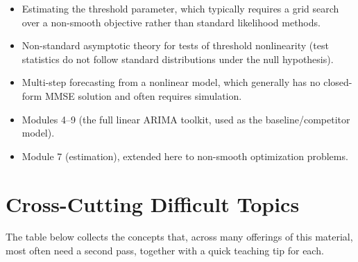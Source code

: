 \documentclass[11pt]{article}
\begin{document}
\begin{difficult}
\begin{itemize}
  \item Estimating the threshold parameter, which typically requires a grid search over a non-smooth objective rather than standard likelihood methods.
  \item Non-standard asymptotic theory for tests of threshold nonlinearity (test statistics do not follow standard distributions under the null hypothesis).
  \item Multi-step forecasting from a nonlinear model, which generally has no closed-form MMSE solution and often requires simulation.
\end{itemize}
\end{difficult}

\begin{prereqs}
\begin{itemize}
  \item Modules 4--9 (the full linear ARIMA toolkit, used as the baseline/competitor model).
  \item Module 7 (estimation), extended here to non-smooth optimization problems.
\end{itemize}
\end{prereqs}

\newpage
\section{Cross-Cutting Difficult Topics}
The table below collects the concepts that, across many offerings of this material, most often need a second pass, together with a quick teaching tip for each.
\end{document}
